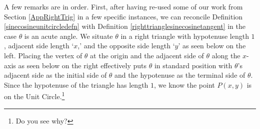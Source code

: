 \documentclass{ximera}
\begin{document}
\begin{example}
\begin{explanation}
\begin{enumerate}
\begin{image}

\end{image}

\end{enumerate}

\end{explanation}
\end{example}

A few remarks are in order.  First, after having re-used some of our work from Section \ref{AppRightTrig} in a few specific instances, we can reconcile Definition \ref{sinecosineunitcircledefn} with Definition \ref{righttrianglesinecosinetangent} in the case $\theta$ is an acute angle.  We situate $\theta$ in a right triangle with hypotenuse length $1$, adjacent side length `$x$,' and the opposite side length `$y$' as seen below on the left. Placing the vertex of $\theta$ at the origin and the adjacent side of $\theta$ along the $x$-axis as seen below on the right effectively puts $\theta$ in standard position with $\theta$'s adjacent side as the initial side of $\theta$ and the hypotenuse  as the terminal side of $\theta$.  Since the hypotenuse of the triangle has length $1$, we know the point $P(x,y)$ is on the Unit Circle.\footnote{Do you see why?}
\end{document}
